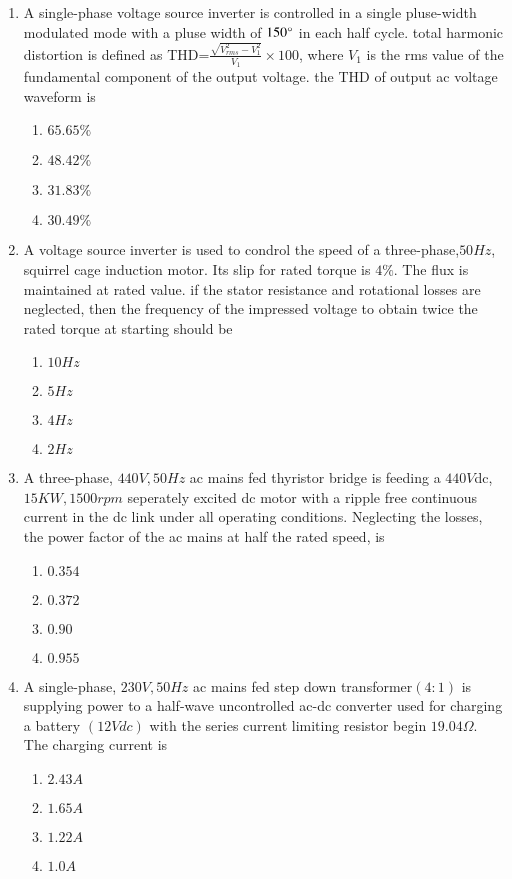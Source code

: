 \documentclass[journal,12pt,onecolumn]{IEEEtran}
\theoremstyle{remark}
\begin{document}
\begin{enumerate}
\item A single-phase voltage source inverter is controlled in a single pluse-width modulated mode with a pluse width of $150\degree$ in each half cycle. total harmonic distortion is defined as THD=$\frac{\sqrt{V_{rms}^2-V_1^2}}{V_1}\times 100$, where $V_1$ is the rms value of the fundamental component of the output voltage. the THD of output ac voltage waveform is 
\begin{enumerate}
    \item $65.65\% $
    \item $48.42\%$
    \item $31.83\% $
    \item $30.49 \%$\\
\end{enumerate}

\item A voltage source inverter is used to condrol the speed of a three-phase,$50 Hz$, squirrel cage induction motor. Its slip for rated torque is $4\%$. The flux is maintained at rated value. if the stator resistance and rotational losses are neglected, then the frequency of the impressed voltage to obtain twice the rated torque at starting should be 
\begin{enumerate}
    \item $10 Hz$
    \item $5 Hz$
    \item $4 Hz$
    \item $2 Hz$\\
\end{enumerate}

\item A three-phase, $440V,50 Hz$ ac mains fed thyristor bridge is feeding a $440 V $dc, $15 KW, 1500 rpm$ seperately excited dc motor with a ripple free continuous current in the dc link under all operating conditions. Neglecting the losses, the power factor of the ac mains at half the rated speed, is 
\begin{enumerate}
    \item $0.354$
    \item $0.372$
    \item $0.90$
    \item $0.955$\\
\end{enumerate}

\item A single-phase, $230V,50Hz$ ac mains fed step down transformer$(4:1)$ is supplying power to a half-wave uncontrolled ac-dc converter used for charging a battery $(12 V dc)$ with the series current limiting resistor begin $19.04\Omega$. The charging current is 
\begin{enumerate}
    \item $2.43 A$
    \item $1.65 A$
    \item $1.22 A$
    \item $1.0 A $ \\
\end{enumerate}


\end{enumerate}
\end{document}
